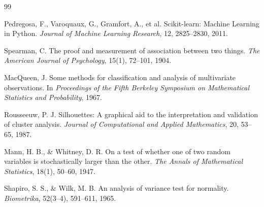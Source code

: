 \documentclass[11pt,a4paper]{article}
\begin{document}
\begin{thebibliography}{99}

Pedregosa, F., Varoquaux, G., Gramfort, A., et al.
Scikit-learn: Machine Learning in Python.
\textit{Journal of Machine Learning Research}, 12, 2825--2830, 2011.

Spearman, C.
The proof and measurement of association between two things.
\textit{The American Journal of Psychology}, 15(1), 72--101, 1904.

MacQueen, J.
Some methods for classification and analysis of multivariate observations.
In \textit{Proceedings of the Fifth Berkeley Symposium on Mathematical Statistics and Probability}, 1967.

Rousseeuw, P. J.
Silhouettes: A graphical aid to the interpretation and validation of cluster analysis.
\textit{Journal of Computational and Applied Mathematics}, 20, 53--65, 1987.

Mann, H. B., \& Whitney, D. R.
On a test of whether one of two random variables is stochastically larger than the other.
\textit{The Annals of Mathematical Statistics}, 18(1), 50--60, 1947.

Shapiro, S. S., \& Wilk, M. B.
An analysis of variance test for normality.
\textit{Biometrika}, 52(3--4), 591--611, 1965.

\end{thebibliography}
\end{document}
